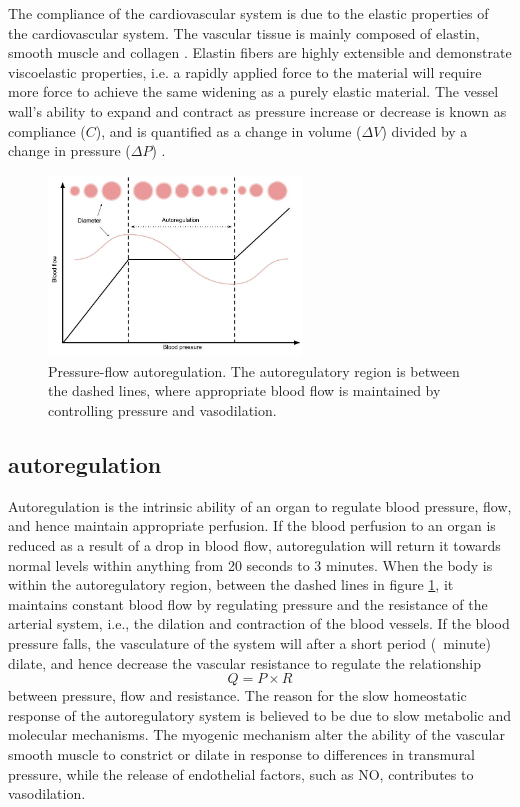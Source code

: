 The compliance of the cardiovascular system is due to the elastic properties of the cardiovascular system. The vascular tissue is mainly composed of elastin, smooth muscle and collagen \cite{RN11}\cite{RN17}. Elastin fibers are highly extensible and demonstrate viscoelastic properties, i.e. a rapidly applied force to the material will require more force to achieve the same widening as a purely elastic material. The vessel wall's ability to expand and contract as pressure increase or decrease is known as compliance ($C$), and is quantified as a change in volume ($\Delta V$) divided by a change in pressure ($\Delta P$) \cite{RN15}. 

\begin{figure}[h!]
    \centering
    \includegraphics[width=0.6\textwidth]{fig/theory/compliance_flow.jpg}
    \caption{Pressure-flow autoregulation. The autoregulatory region is between the dashed lines, where appropriate blood flow is maintained by controlling pressure and vasodilation.}
    \label{fig:compliance_flow}
\end{figure}{}


\subsection{autoregulation} \label{sect:autoregulation}
Autoregulation is the intrinsic ability of an organ to regulate blood pressure, flow, and hence maintain appropriate perfusion. If the blood perfusion to an organ is reduced as a result of a drop in blood flow, autoregulation will return it towards normal levels within anything from 20 seconds to 3 minutes.\cite{RN19} When the body is within the autoregulatory region, between the dashed lines in figure \ref{fig:compliance_flow}, it maintains constant blood flow by regulating pressure and the resistance of the arterial system, i.e., the dilation and contraction of the blood vessels. If the blood pressure falls, the vasculature of the system will after a short period (~minute) dilate, and hence decrease the vascular resistance to regulate the relationship
\begin{equation}
    Q = P\times R
    \label{eq:pressure&flow}
\end{equation}
between pressure, flow and resistance. The reason for the slow homeostatic response of the autoregulatory system is believed to be due to slow metabolic and molecular mechanisms. The myogenic mechanism alter the ability of the vascular smooth muscle to constrict or dilate in response to differences in transmural pressure, while the release of endothelial factors, such as NO, contributes to vasodilation. \cite{RN17}

